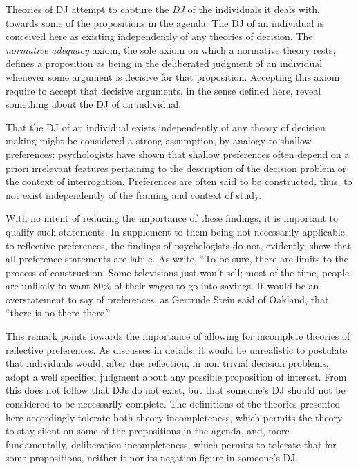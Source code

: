 \documentclass[version=last, pagesize, twoside=off, bibliography=totoc, DIV=calc, fontsize=12pt, a4paper, french, english]{scrartcl}
\begin{document}
Theories of \ac{DJ} attempt to capture the \emph{\acl{DJ}} of the individuals it deals with, towards some of the propositions in the agenda. 
The \ac{DJ} of an individual is conceived here as existing independently of any theories of decision.
The \emph{normative adequacy} axiom, the sole axiom on which a normative theory rests, defines a proposition as being in the deliberated judgment of an individual whenever some argument is decisive for that proposition.
Accepting this axiom require to accept that decisive arguments, in the sense defined here, reveal something about the \ac{DJ} of an individual. 

That the \ac{DJ} of an individual exists independently of any theory of decision making might be considered a strong assumption, by analogy to shallow preferences: psychologists have shown that shallow preferences often depend on a priori irrelevant features pertaining to the description of the decision problem or the context of interrogation. Preferences are often said to be constructed, thus, to not exist independently of the framing and context of study.

With no intent of reducing the importance of these findings, it is important to qualify such statements. In supplement to them being not necessarily applicable to reflective preferences, the findings of psychologists do not, evidently, show that all preference statements are labile. As \citet[p.\ xvi]{lichtenstein_construction_2006} write, “To be sure, there are limits to the process of construction. Some televisions just won’t sell; most of the time, people are unlikely to want 80\% of their wages to go into savings. It would be an overstatement to say of preferences, as Gertrude Stein said of Oakland, that “there is no there there.” 

This remark points towards the importance of allowing for incomplete theories of reflective preferences. As \citet{mandler_difficult_2001} discusses in details, it would be unrealistic to postulate that individuals would, after due reflection, in non trivial decision problems, adopt a well specified judgment about any possible proposition of interest.
From this does not follow that \acp{DJ} do not exist, but that someone’s \ac{DJ} should not be considered to be necessarily complete. 
The definitions of the theories presented here accordingly tolerate both theory incompleteness, which permits the theory to stay silent on some of the propositions in the agenda, and, more fundamentally, deliberation incompleteness, which permits to tolerate that for some propositions, neither it nor its negation figure in someone’s \ac{DJ}. 
\end{document}
